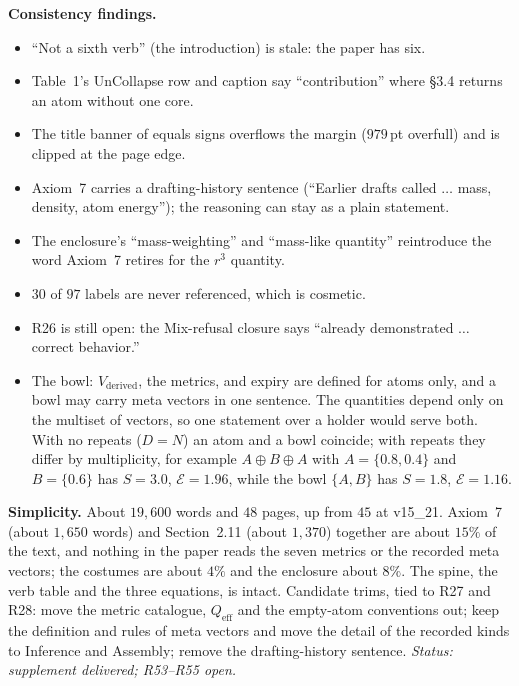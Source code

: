 \documentclass[11pt]{article}
\begin{document}
\textbf{Consistency findings.}
\begin{itemize}
\item ``Not a sixth verb'' (the introduction) is stale: the paper has six.
\item Table~1's UnCollapse row and caption say ``contribution'' where
\S3.4 returns an atom without one core.
\item The title banner of equals signs overflows the margin ($979$\,pt
overfull) and is clipped at the page edge.
\item Axiom~7 carries a drafting-history sentence (``Earlier drafts called
$\ldots$ mass, density, atom energy''); the reasoning can stay as a plain
statement.
\item The enclosure's ``mass-weighting'' and ``mass-like quantity''
reintroduce the word Axiom~7 retires for the $r^3$ quantity.
\item $30$ of $97$ labels are never referenced, which is cosmetic.
\item R26 is still open: the Mix-refusal closure says ``already
demonstrated $\ldots$ correct behavior.''
\item The bowl: $V_{\text{derived}}$, the metrics, and expiry are defined
for atoms only, and a bowl may carry meta vectors in one sentence. The
quantities depend only on the multiset of vectors, so one statement over a
holder would serve both. With no repeats ($D=N$) an atom and a bowl
coincide; with repeats they differ by multiplicity, for example
$A\oplus B\oplus A$ with $A=\{0.8,0.4\}$ and $B=\{0.6\}$ has $S=3.0$,
$\mathcal{E}=1.96$, while the bowl $\{A,B\}$ has $S=1.8$,
$\mathcal{E}=1.16$.
\end{itemize}

\textbf{Simplicity.} About $19{,}600$ words and $48$ pages, up from $45$ at
v15\_21. Axiom~7 (about $1{,}650$ words) and Section~2.11 (about $1{,}370$)
together are about $15\%$ of the text, and nothing in the paper reads the
seven metrics or the recorded meta vectors; the costumes are about $4\%$ and
the enclosure about $8\%$. The spine, the verb table and the three
equations, is intact. Candidate trims, tied to R27 and R28: move the metric
catalogue, $Q_{\mathrm{eff}}$ and the empty-atom conventions out; keep the
definition and rules of meta vectors and move the detail of the recorded
kinds to Inference and Assembly; remove the drafting-history sentence.
\emph{Status: supplement delivered; R53--R55 open.}
\end{document}
